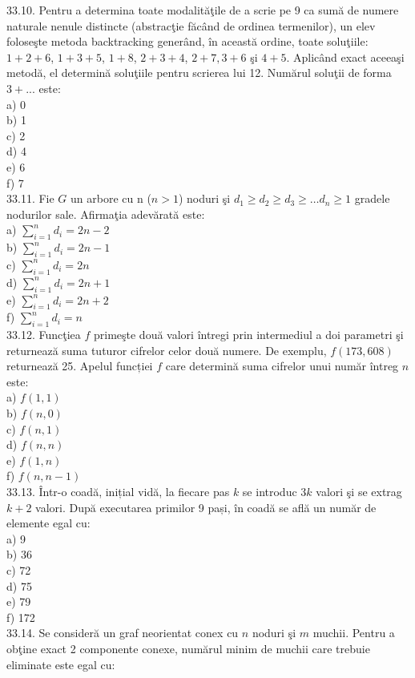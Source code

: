 \begin{itemize}
\begin{enumerate}
33.10. Pentru a determina toate modalităţile de a scrie pe 9 ca sumă de numere naturale nenule distincte (abstracţie făcând de ordinea termenilor), un elev foloseşte metoda backtracking generând, în această ordine, toate soluţiile: $1+2+6$, $1+3+5$, $1+8$, $2+3+4$, $2+7,3+6$ şi $4+5$. Aplicând exact aceeaşi metodă, el determină soluţiile pentru scrierea lui 12. Numărul soluţii de forma $3+...$ este:
\\
a) 0
\\
b) 1
\\
c) 2
\\
d) 4
\\
e) 6
\\
f) 7
\\
33.11. Fie $G$ un arbore cu n ($n>1$) noduri şi $d_{1} \geq d_{2} \geq d_{3} \geq \ldots d_{n} \geq 1$ gradele nodurilor sale. Afirmaţia adevărată este:
\\
a) $\sum_{i=1}^{n} d_{i}=2n-2$
\\
b) $\sum_{i=1}^{n} d_{i}=2n-1$
\\
c) $\sum_{i=1}^{n} d_{i}=2 n$
\\
d) $\sum_{i=1}^{n} d_{i}=2n+1$
\\
e) $\sum_{i=1}^{n} d_{i}=2n+2$
\\
f) $\sum_{i=1}^{n} d_{i}=n$
\\
33.12. Funcţiea $f$ primeşte două valori întregi prin intermediul a doi parametri şi returnează suma tuturor cifrelor celor două numere. De exemplu, $f(173,608)$ returnează 25. Apelul funcției $f$ care determină suma cifrelor unui număr întreg $n$ este:
\\
a) $f(1, 1)$
\\
b) $f(n, 0)$
\\
c) $f(n, 1)$
\\
d) $f(n, n)$
\\
e) $f(1, n)$
\\
f) $f(n, n-1)$
\\
33.13. Într-o coadă, inițial vidă, la fiecare pas $k$ se introduc $3 k$ valori şi se extrag $k+2$ valori. După executarea primilor 9 pași, în coadă se află un număr de elemente egal cu:
\\
a) 9
\\
b) 36
\\
c) 72
\\
d) 75
\\
e) 79
\\
f) 172
\\
33.14. Se consideră un graf neorientat conex cu $n$ noduri şi $m$ muchii. Pentru a obţine exact 2 componente conexe, numărul minim de muchii care trebuie eliminate este egal cu:

\end{enumerate}
\end{itemize}
